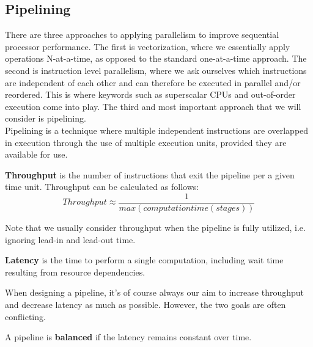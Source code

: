 \documentclass[main.tex]{subfiles}
\begin{document}
\subsection{Pipelining}
There are three approaches to applying parallelism to improve sequential processor performance. The first is vectorization, where we essentially apply operations N-at-a-time, as opposed to the standard one-at-a-time approach. The second is instruction level parallelism, where we ask ourselves which instructions are independent of each other and can therefore be executed in parallel and/or reordered. This is where keywords such as superscalar CPUs and out-of-order execution come into play. The third and most important approach that we will consider is pipelining. \\[3mm]
Pipelining is a technique where multiple independent instructions are overlapped in execution through the use of multiple execution units, provided they are available for use.
\begin{definition}
    \textbf{Throughput} is the number of instructions that exit the pipeline per a given time unit. Throughput can be calculated as follows:
    \begin{equation*}
        Throughput \approx \frac{1}{max(computationtime(stages))}
    \end{equation*}
\end{definition}
Note that we usually consider throughput when the pipeline is fully utilized, i.e. ignoring lead-in and lead-out time.
\begin{definition}
    \textbf{Latency} is the time to perform a single computation, including wait time resulting from resource dependencies.
\end{definition}
When designing a pipeline, it's of course always our aim to increase throughput and decrease latency as much as possible. However, the two goals are often conflicting.
\begin{definition}
    A pipeline is \textbf{balanced} if the latency remains constant over time.
\end{definition}
\end{document}
